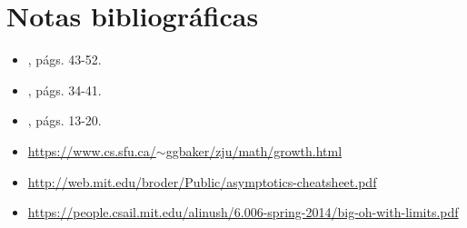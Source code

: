 \section*{Notas bibliográficas}

\begin{itemize}
    \item \textcite{cormen_introduction_2009}, págs. 43-52.
    \item \textcite{skiena_algorithm_2011}, págs. 34-41.
    \item \textcite{goodrich_algorithm_2001}, págs. 13-20.
    \item \href{https://www.cs.sfu.ca/~ggbaker/zju/math/growth.html}{https://www.cs.sfu.ca/$\sim$ggbaker/zju/math/growth.html}
    \item \href{http://web.mit.edu/broder/Public/asymptotics-cheatsheet.pdf}{http://web.mit.edu/broder/Public/asymptotics-cheatsheet.pdf}
    \item \href{https://people.csail.mit.edu/alinush/6.006-spring-2014/big-oh-with-limits.pdf}{https://people.csail.mit.edu/alinush/6.006-spring-2014/big-oh-with-limits.pdf}
\end{itemize}
